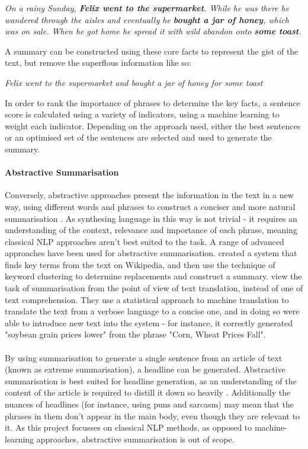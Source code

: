 \textit{On a rainy Sunday, \textbf{Felix went to the supermarket}. While he was there he wandered through the aisles and eventually he \textbf{bought a jar of honey}, which was on sale. When he got home he spread it with wild abandon onto \textbf{some toast}.}

A summary can be constructed using these core facts to represent the gist of the text, but remove the superflous information like so:

\textit{Felix went to the supermarket and bought a jar of honey for some toast}

In order to rank the importance of phrases to determine the key facts, a sentence score is calculated using a variety of indicators, using a machine learning to weight each indicator. Depending on the approach used, either the best sentences or an optimised set of the sentences are selected and used to generate the summary.

\paragraph{Abstractive Summarisation}
Conversely, abstractive approaches present the information in the text in a new way, using different words and phrases to construct a conciser and more natural summarisation \cite{allahyari2017}. As synthesing language in this way is not trivial - it requires an understanding of the context, relevance and importance of each phrase, meaning classical NLP approaches aren't best suited to the task. A range of advanced approaches have been used for abstractive summarisation. \citeauthor{xu2010} created a system that finds key terms from the text on Wikipedia, and then use the technique of keyword clustering to determine replacements and construct a summary. \citeauthor{banko2000} view the task of summarisation from the point of view of text translation, instead of one of text comprehension. They use a statistical approach to machine translation to translate the text from a verbose language to a concise one, and in doing so were able to introduce new text into the system - for instance, it correctly generated "soybean grain prices lower" from the phrase "Corn, Wheat Prices Fall".

\paragraph{}
By using summarisation to generate a single sentence from an article of text (known as extreme summarisation), a headline can be generated. Abstractive summarisation is best suited for headline generation, as an understanding of the content of the article is required to distill it down so heavily \cite{hayashi2018}. Additionally the nuances of headlines (for instance, using puns and sarcasm) may mean that the phrases in them don't appear in the main body, even though they are relevant to it. As this project focusses on classical NLP methods, as opposed to machine-learning approaches, abstractive summarisation is out of scope.
